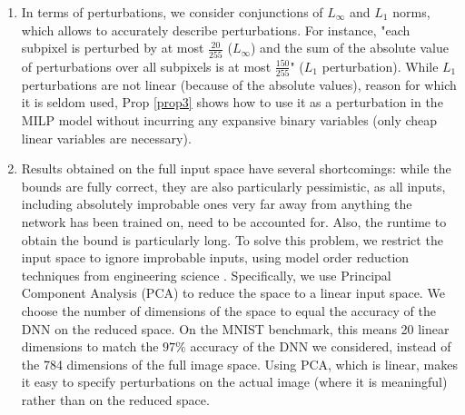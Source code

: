 \begin{enumerate}
   \item  In terms of perturbations, we consider conjunctions of $L_\infty$ and $L_1$ norms, which allows to accurately describe perturbations. For instance, "each subpixel is perturbed by at most $\frac{20}{255}$ ($L_\infty$) and the sum of the absolute value of perturbations over all subpixels is at most $\frac{150}{255}$" ($L_1$ perturbation). While $L_1$ perturbations are not linear (because of the absolute values), reason for which it is seldom used, Prop \ref{prop3} shows how to use it as a perturbation in the MILP model without incurring any expansive binary variables (only cheap linear variables are necessary).

	\item Results obtained on the full input space have several shortcomings: while the bounds are fully correct, they are also particularly pessimistic, as all inputs, including absolutely improbable ones very far away from anything the network has been trained on, need to be accounted for. Also, the runtime to obtain the bound is particularly long. 
	To solve this problem, we restrict the input space to ignore improbable inputs, using model order reduction techniques from engineering science \cite{aiware}. Specifically, we use Principal Component Analysis (PCA) to reduce the space to a linear input space. We choose the number of dimensions of the space to equal the accuracy of the DNN on the reduced space. 
	On the MNIST benchmark, this means 20 linear dimensions to match the $97\%$ accuracy of the DNN we considered, instead of the 784 dimensions of the full image space. Using PCA, which is linear, makes it easy to specify perturbations on the actual image (where it is meaningful) rather than on the reduced space.


\end{enumerate}
